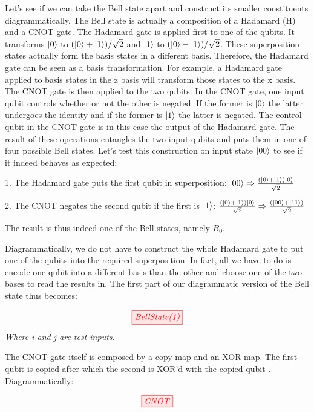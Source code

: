 \documentclass[]{article}
\begin{document}
Let's see if we can take the Bell state apart and construct its smaller constituents diagrammatically. The Bell state is actually a composition of a Hadamard (H) and a CNOT gate. The Hadamard gate is applied first to one of the qubits. It transforms $\ket{0}$ to  $(\ket{0} + \ket{1})/\sqrt{2}$ and $\ket{1}$ to $(\ket{0} - \ket{1})/\sqrt{2}$. These superposition states actually form the basis states in a different basis. Therefore, the Hadamard gate can be seen as a basis transformation. For example, a Hadamard gate applied to basis states in the z basis will transform those states to the x basis. The CNOT gate is then applied to the two qubits. In the CNOT gate, one input qubit controls whether or not the other is negated. If the former is $\ket{0}$ the latter undergoes the identity and if the former is $\ket{1}$ the latter is negated. The control qubit in the CNOT gate is in this case the output of the Hadamard gate. The result of these operations entangles the two input qubits and puts them in one of four possible Bell states. Let's test this construction on input state $\ket{00}$ to see if it indeed behaves as expected:

1. The Hadamard gate puts the first qubit in superposition: $\ket{00} \Rightarrow \frac{(\ket{0} + \ket{1})\ket{0}}{\sqrt{2}}$

2. The CNOT negates the second qubit if the first is $\ket{1}$: $\frac{(\ket{0} + \ket{1})\ket{0}}{\sqrt{2}} \Rightarrow \frac{(\ket{00} + \ket{11})}{\sqrt{2}}$

The result is thus indeed one of the Bell states, namely $B_0$.

Diagrammatically, we do not have to construct the whole Hadamard gate to put one of the qubits into the required superposition. In fact, all we have to do is encode one qubit into a different basis than the other and choose one of the two bases to read the results in. The first part of our diagrammatic version of the Bell state thus becomes:

\begin{equation}
	\label{equation:BellState(1)}
	\tikzfig{BellState(1)}
\end{equation}
\textit{Where i and j are test inputs.}

The CNOT gate itself is composed by a copy map and an XOR map. The first qubit is copied after which the second is XOR'd with the copied qubit \cite{articleCNOT}. Diagrammatically:

\begin{equation}
	\label{equation:CNOT}
	\tikzfig{CNOT}
\end{equation}
\end{document}
